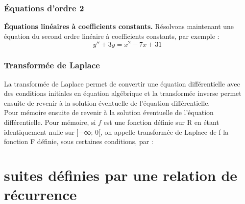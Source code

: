 \subsection{ Équations d’ordre 2}
\textbf{Équations linéaires à coefficients constants.} Résolvons maintenant une équation du second ordre linéaire à coefficients constants, par exemple :
\[
 y''+3y = x^{2}-7x+31
\]
\subsection{ Transformée de Laplace}
La transformée de Laplace permet de convertir une équation différentielle avec
des conditions initiales en équation algébrique et la transformée inverse permet
ensuite de revenir à la solution éventuelle de l’équation différentielle.
\\
Pour mémoire ensuite de revenir à la solution éventuelle de l’équation différentielle.
Pour mémoire, si $f$ est une fonction définie sur R en étant identiquement nulle
sur ]−∞; 0[, on appelle transformée de Laplace de f la fonction F définie, sous
certaines conditions, par :


\chapter{suites définies par une relation de récurrence}
